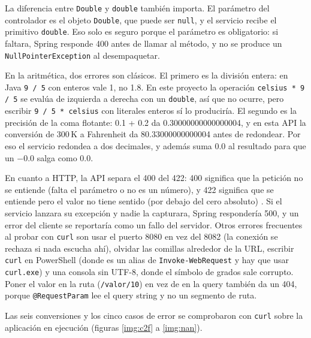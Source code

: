 \documentclass[10pt,a4paper]{article}
\begin{document}
La diferencia entre \texttt{Double} y \texttt{double} también importa. El parámetro del controlador es el objeto \texttt{Double}, que puede ser \texttt{null}, y el servicio recibe el primitivo \texttt{double}. Eso solo es seguro porque el parámetro es obligatorio: si faltara, Spring responde 400 antes de llamar al método, y no se produce un \texttt{NullPointerException} al desempaquetar.

En la aritmética, dos errores son clásicos. El primero es la división entera: en Java \texttt{9 / 5} con enteros vale 1, no 1.8. En este proyecto la operación \texttt{celsius * 9 / 5} se evalúa de izquierda a derecha con un \texttt{double}, así que no ocurre, pero escribir \texttt{9 / 5 * celsius} con literales enteros sí lo produciría. El segundo es la precisión de la coma flotante: 0.1 + 0.2 da 0.30000000000000004, y en esta API la conversión de 300\,K a Fahrenheit da 80.33000000000004 antes de redondear. Por eso el servicio redondea a dos decimales, y además suma 0.0 al resultado para que un $-0.0$ salga como 0.0.

En cuanto a HTTP, la API separa el 400 del 422: 400 significa que la petición no se entiende (falta el parámetro o no es un número), y 422 significa que se entiende pero el valor no tiene sentido (por debajo del cero absoluto) \cite{rfc9110}. Si el servicio lanzara su excepción y nadie la capturara, Spring respondería 500, y un error del cliente se reportaría como un fallo del servidor. Otros errores frecuentes al probar con \texttt{curl} son usar el puerto 8080 en vez del 8082 (la conexión se rechaza si nada escucha ahí), olvidar las comillas alrededor de la URL, escribir \texttt{curl} en PowerShell (donde es un alias de \texttt{Invoke-WebRequest} y hay que usar \texttt{curl.exe}) y una consola sin UTF-8, donde el símbolo de grados sale corrupto. Poner el valor en la ruta (\texttt{/valor/10}) en vez de en la query también da un 404, porque \texttt{@RequestParam} lee el query string y no un segmento de ruta.

Las seis conversiones y los cinco casos de error se comprobaron con \texttt{curl} sobre la aplicación en ejecución (figuras \ref{img:c2f} a \ref{img:nan}).

\section{\color{colorIPN}{Referencias Bibliográficas}}
\nocite{*}
\color{colorESCOM}{
	\printbibliography[heading=none]
}
\end{document}
